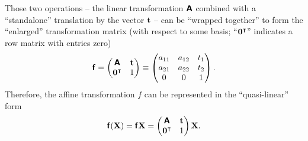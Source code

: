 Those two operations -- the linear transformation $\textsf{\textbf{A}}$ combined with a ``standalone'' translation by the vector ${\bf t}$ --
can be ``wrapped together'' to form the ``enlarged'' transformation matrix  (with respect to some basis;
``${\bf 0}^\intercal $'' indicates a row matrix with entries zero)
\begin{equation}
\textsf{\textbf{f}}=
\begin{pmatrix}
\textsf{\textbf{A}}&{\bf t}\\
{\bf 0}^\intercal &1
\end{pmatrix}
\equiv
\begin{pmatrix}
a_{11}&a_{12}&{t}_1\\
a_{21}&a_{22}&{t}_2\\
0&0&1
\end{pmatrix}
.
\label{2018-mm-ch-projgeom-def}
\end{equation}
Therefore, the affine transformation $f$ can be represented in the ``quasi-linear'' form
\begin{equation}
\textsf{\textbf{f}}({\bf X})
=
\textsf{\textbf{f}}{\bf X}
=
\begin{pmatrix}
\textsf{\textbf{A}}&{\bf t}\\
{\bf 0}^\intercal &1
\end{pmatrix}
{\bf X}
.
\label{2018-mm-ch-projgeom-def1}
\end{equation}

